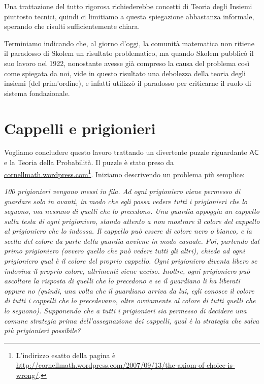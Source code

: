 \documentclass[12pt,a4paper]{report}
\theoremstyle{definition}
\theoremstyle{num.custom-title}
\newcommand{\AC}{\ensuremath{\mathsf{AC}}\xspace}
\begin{document}
Una trattazione del tutto rigorosa richiederebbe concetti di Teoria degli Insiemi piuttosto tecnici, quindi ci limitiamo a questa spiegazione abbastanza informale, sperando che risulti sufficientemente chiara.

Terminiamo indicando che, al giorno d'oggi, la comunità matematica non ritiene il paradosso di Skolem un risultato problematico, ma quando Skolem pubblicò il suo lavoro nel 1922, nonostante avesse già compreso la causa del problema così come spiegata da noi, vide in questo risultato una debolezza della teoria degli insiemi (del prim'ordine), e infatti utilizzò il paradosso per criticarne il ruolo di sistema fondazionale.



\chapter{Cappelli e prigionieri}

Vogliamo concludere questo lavoro trattando un divertente puzzle riguardante \AC e la Teoria della Probabilità. Il puzzle è stato preso da \url{cornellmath.wordpress.com}\footnote{L'indirizzo esatto della pagina è \url{http://cornellmath.wordpress.com/2007/09/13/the-axiom-of-choice-is-wrong/}.}. Iniziamo descrivendo un problema più semplice:
\begin{flushleft}
\emph{100 prigionieri vengono messi in fila. Ad ogni prigioniero viene permesso di guardare solo in avanti, in modo che egli possa vedere tutti i prigionieri che lo seguono, ma nessuno di quelli che lo precedono. Una guardia appoggia un cappello sulla testa di ogni prigioniero, stando attento a non mostrare il colore del cappello al prigioniero che lo indossa. Il cappello può essere di colore nero o bianco, e la scelta del colore da parte della guardia avviene in modo casuale. Poi, partendo dal primo prigioniero (ovvero quello che può vedere tutti gli altri), chiede ad ogni prigioniero qual è il colore del proprio cappello. Ogni prigioniero diventa libero se indovina il proprio colore, altrimenti viene ucciso. Inoltre, ogni prigioniero può ascoltare la risposta di quelli che lo precedono e se il guardiano li ha liberati oppure no (quindi, una volta che il guardiano arriva da lui, egli conosce il colore di tutti i cappelli che lo precedevano, oltre ovviamente al colore di tutti quelli che lo seguono). Supponendo che a tutti i prigionieri sia permesso di decidere una comune strategia prima dell'assegnazione dei cappelli, qual è la strategia che salva più prigionieri possibile?}
\end{flushleft}
\end{document}
